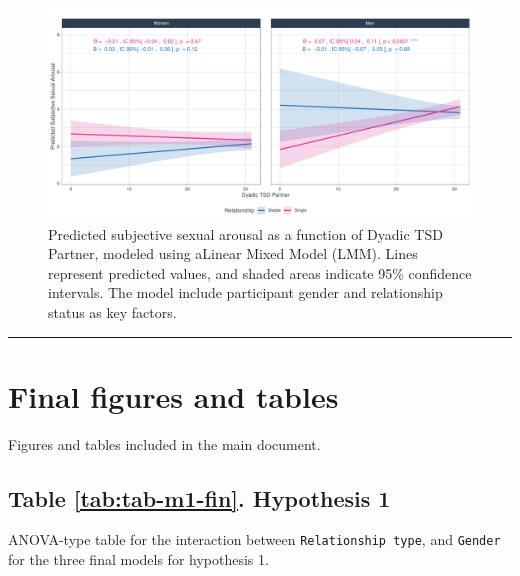 \documentclass[
  bookmarksnumbered]{article}
\begin{document}
\begin{figure}
\centering
\includegraphics{Sexual_Desire_Arousal_files/figure-latex/fig-h3c-1.pdf}
\caption{\label{fig:fig-h3c}Predicted subjective sexual arousal as a function of Dyadic TSD Partner, modeled using aLinear Mixed Model (LMM). Lines represent predicted values, and shaded areas indicate 95\% confidence intervals. The model include participant gender and relationship status as key factors.}
\end{figure}

\begin{center}\rule{0.5\linewidth}{0.5pt}\end{center}

\closesupplement

\section{Final figures and tables}\label{final-figures-and-tables}

Figures and tables included in the main document.

\subsection{Table \ref{tab:tab-m1-fin}. Hypothesis 1}\label{table-reftabtab-m1-fin.-hypothesis-1}

ANOVA-type table for the interaction between \texttt{Relationship\ type}, and \texttt{Gender} for the three final models for hypothesis 1.
\end{document}
